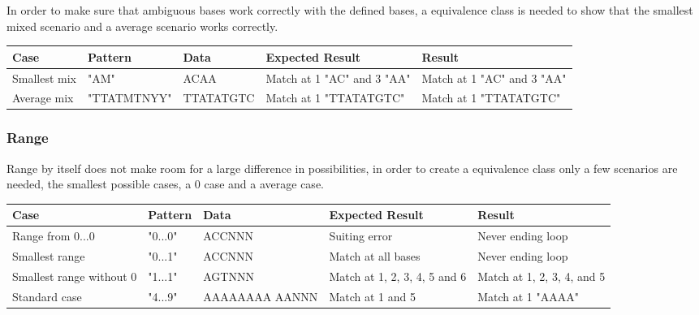 \documentclass[12pt]{article}
\begin{document}
In order to make sure that ambiguous bases work correctly with the defined bases, a equivalence class is needed
to show that the smallest mixed scenario and a average scenario works correctly.
\begin{table}[H]
\begin{tabular}{p{4cm}|p{3.6cm}|p{2.5cm}|p{2.2cm}|p{2.2cm}}
Case 			& Pattern & Data & Expected Result & Result \\ \hline
\rowcolor{lightgreen}
Smallest mix		& "AM" & ACAA & Match at 1 "AC" and 3 "AA" & Match at 1 "AC" and 3 "AA" \\ \hline
\rowcolor{lightgreen}
Average mix		& "TTATMTNYY" & TTATATGTC & Match at 1 "TTATATGTC" & Match at 1 "TTATATGTC"
\end{tabular}
\end{table}


\subsubsection{Range}
Range by itself does not make room for a large difference in possibilities, in order to create a 
equivalence class only a few scenarios are needed, the smallest possible cases, a 0 case and a average case.
\begin{table}[H]
\begin{tabular}{p{4cm}|p{3cm}|p{2.5cm}|p{2.5cm}|p{2.5cm}}
Case 			& Pattern & Data & Expected Result & Result \\ \hline
\rowcolor{lightred}
Range from 0...0	& "0...0" & ACCNNN & Suiting error & Never ending loop \\ \hline
\rowcolor{lightred}
Smallest range 	& "0...1" & ACCNNN & Match at all bases & Never ending loop \\ \hline
\rowcolor{lightgreen}
Smallest range without 0 & "1...1" & AGTNNN & Match at 1, 2, 3, 4, 5 and 6 & Match at 1, 2, 3, 4, and 5 \\ \hline
\rowcolor{lightgreen}
Standard case	& "4...9" & AAAAAAAA AANNN & Match at 1 and 5 & Match at 1 "AAAA"
\end{tabular}
\end{table} 
\end{document}
